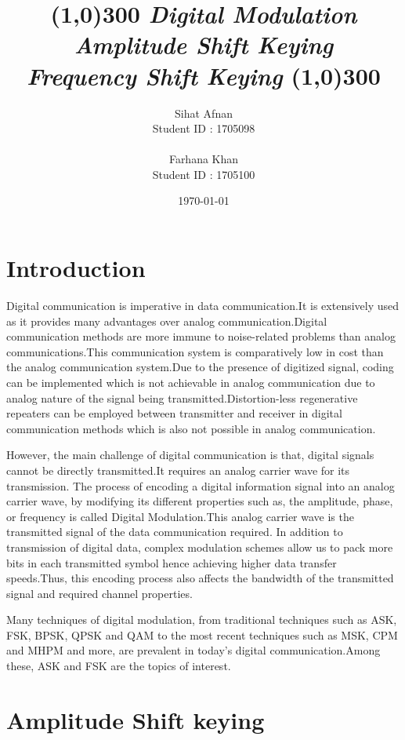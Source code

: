 \documentclass{report}
\title{
	\line(1,0){300}
	\endgraf\bigskip
	\Huge
	\emph{Digital Modulation\\Amplitude Shift Keying\\
		\hspace{1.1cm}Frequency Shift Keying}
	\newline
	\line(1,0){300}
	\bigskip
	\bigskip
}
\author{
	\Large{Sihat Afnan}\\
	\Large{Student ID : 1705098}\\\\
	\Large{Farhana Khan}\\
	\Large{Student ID : 1705100}
}
\date{
	\endgraf\bigskip
	\Large{\today}
}
\begin{document}
	
	\maketitle
	\renewcommand{\familydefault}{\sfdefault}
	
	\tableofcontents
	
	\chapter{Introduction}
	Digital communication is imperative in data communication.It is extensively used as it provides many advantages over analog communication.Digital communication methods are more immune to noise-related problems than analog communications.This communication system is comparatively low in cost than the analog communication system.Due to the presence of digitized signal, coding can be implemented which is not achievable in analog communication due to analog nature of the signal being transmitted.Distortion-less regenerative repeaters can be employed between transmitter and receiver in digital communication methods which is also not possible in analog communication.\bigskip
	
	However, the main challenge of digital communication is that, digital signals cannot be directly transmitted.It requires an analog carrier wave for its transmission. The process of encoding a digital information signal into an analog carrier wave, by modifying its different properties such as, the amplitude, phase, or frequency is called Digital Modulation.This analog carrier wave is the transmitted signal of the data communication required. In addition to transmission of digital data, complex modulation schemes allow us to pack more bits in each transmitted symbol hence achieving higher data transfer speeds.Thus, this encoding process also affects the bandwidth of the transmitted signal and required channel properties.\bigskip
	
	Many techniques of digital modulation, from traditional techniques such as ASK, FSK, BPSK, QPSK and QAM to the most recent techniques such as MSK, CPM and MHPM and more, are prevalent in today's digital communication.Among these, ASK and FSK are the topics of interest.
	
	\newpage
	
	\chapter{Amplitude Shift keying}
	
\end{document}
